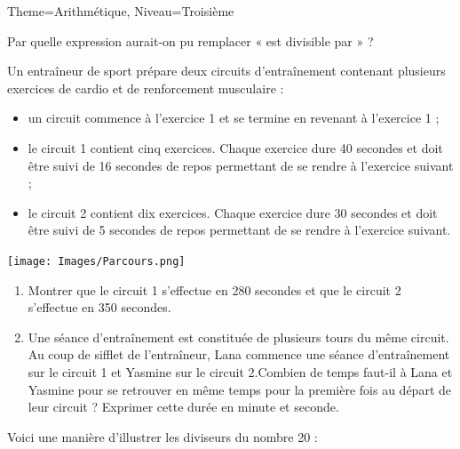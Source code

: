 \documentclass[11pt]{article}
\begin{document}
\begin{multicols}{2}
\begin{Maquette}[Fiche]{Theme=Arithmétique, Niveau=Troisième}
\begin{exercice}[Calculatrice=false]
    \vspace{1.2em}
    Par quelle expression aurait-on pu remplacer « est divisible par » ?
    
\end{exercice}

\columnbreak
\begin{exercice}[Source=DNB Juin 2024 Centres étrangers]
    Un entraîneur de sport prépare deux circuits d’entraînement contenant plusieurs exercices de cardio et de renforcement musculaire :
    \begin{itemize}
        \item un circuit commence à l’exercice 1 et se termine en revenant à l’exercice 1 ;
        \item le circuit 1 contient cinq exercices. Chaque exercice dure 40 secondes et doit être suivi de 16 secondes de repos permettant de se rendre à l’exercice suivant ;
        \item le circuit 2 contient dix exercices. Chaque exercice dure 30 secondes et doit être suivi de 5 secondes de repos permettant de se rendre à l’exercice suivant.
    \end{itemize}
    \begin{center}
        \texttt{[image: Images/Parcours.png]}
    \end{center}
    \begin{enumerate}
        \item Montrer que le circuit 1 s’effectue en 280 secondes et que le circuit 2 s’effectue en 350
secondes.
        \item Une séance d’entraînement est constituée de plusieurs tours du même circuit. Au coup de sifflet de l’entraîneur, Lana commence une séance d’entraînement sur le circuit 1 et Yasmine sur le circuit 2.Combien de temps faut-il à Lana et Yasmine pour se retrouver en même temps pour la première fois au départ de leur circuit ? Exprimer cette durée en minute et seconde.
    \end{enumerate}
\end{exercice}

\columnbreak

\begin{exercice}
    Voici une manière d’illustrer les diviseurs du nombre 20 :

    \begin{center}
    \end{center}
    

\end{exercice}
\end{Maquette}
\end{multicols}
\end{document}
